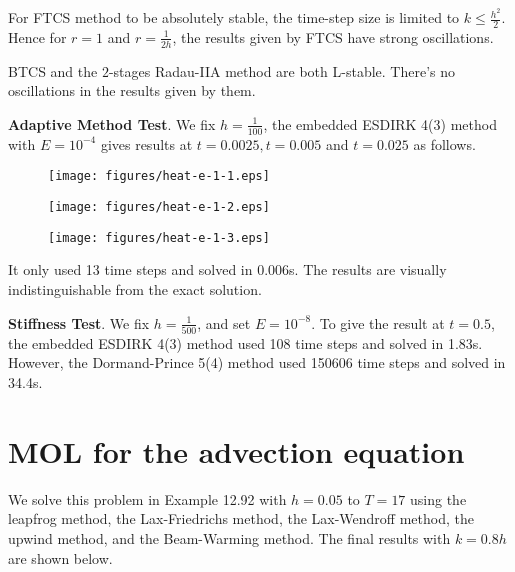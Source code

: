 \documentclass[twocolumn,10pt]{article}
\begin{document}
For FTCS method to be absolutely stable, the time-step size is limited to $k\leq \frac{h^2}{2}$. Hence for $r=1$ and $r=\frac{1}{2h}$, the results given by FTCS have strong oscillations.

BTCS and the $2$-stages Radau-IIA method are both L-stable. There's no oscillations in the results given by them.

\textbf{Adaptive Method Test}. We fix $h=\frac{1}{100}$, the embedded ESDIRK 4(3) method with $E=10^{-4}$ gives results at $t=0.0025,t=0.005$ and $t=0.025$ as follows.

\vspace{-.3em}\begin{figure}[H]
    \centering
    \begin{minipage}[t]{0.32\linewidth}
        \centering
        \texttt{[image: figures/heat-e-1-1.eps]}
    \end{minipage}
    \begin{minipage}[t]{0.32\linewidth}
        \centering
        \texttt{[image: figures/heat-e-1-2.eps]}
    \end{minipage}
    \begin{minipage}[t]{0.32\linewidth}
        \centering
        \texttt{[image: figures/heat-e-1-3.eps]}
    \end{minipage}
\end{figure} \vspace{-.5em}

It only used 13 time steps and solved in 0.006s. The results are visually indistinguishable from the exact solution.

\textbf{Stiffness Test}. We fix $h=\frac{1}{500}$, and set $E=10^{-8}$. To give the result at $t=0.5$, the embedded ESDIRK 4(3) method used 108 time steps and solved in 1.83s. However, the Dormand-Prince 5(4) method used 150606 time steps and solved in 34.4s.

\section{\large MOL for the advection equation}

\;\;\;\;We solve this problem in Example 12.92 with $h=0.05$ to $T=17$ using the leapfrog method, the Lax-Friedrichs method, the Lax-Wendroff method, the upwind method, and the Beam-Warming method. The final results with $k=0.8h$ are shown below.
\end{document}
